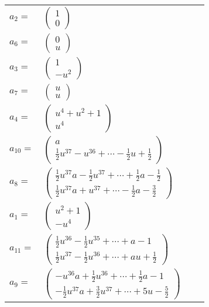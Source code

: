 \documentclass[1p]{elsarticle_modified}
\theoremstyle{definition}
\begin{document}
\begin{tabular}{m{7pt} m{180pt} m{7pt} m{180pt} }
\flushright $a_{2}=$&$\begin{pmatrix}1\\0\end{pmatrix}$ \\
\flushright $a_{6}=$&$\begin{pmatrix}0\\u\end{pmatrix}$ \\
\flushright $a_{3}=$&$\begin{pmatrix}1\\- u^2\end{pmatrix}$ \\
\flushright $a_{7}=$&$\begin{pmatrix}u\\u\end{pmatrix}$ \\
\flushright $a_{4}=$&$\begin{pmatrix}u^4+u^2+1\\u^4\end{pmatrix}$ \\
\flushright $a_{10}=$&$\begin{pmatrix}a\\\frac{1}{2} u^{37}- u^{36}+\cdots-\frac{1}{2} u+\frac{1}{2}\end{pmatrix}$ \\
\flushright $a_{8}=$&$\begin{pmatrix}\frac{1}{2} u^{37} a-\frac{1}{2} u^{37}+\cdots+\frac{1}{2} a-\frac{1}{2}\\\frac{1}{2} u^{37} a+u^{37}+\cdots-\frac{1}{2} a-\frac{3}{2}\end{pmatrix}$ \\
\flushright $a_{1}=$&$\begin{pmatrix}u^2+1\\- u^4\end{pmatrix}$ \\
\flushright $a_{11}=$&$\begin{pmatrix}\frac{1}{2} u^{36}-\frac{1}{2} u^{35}+\cdots+a-1\\\frac{1}{2} u^{37}-\frac{1}{2} u^{36}+\cdots+a u+\frac{1}{2}\end{pmatrix}$ \\
\flushright $a_{9}=$&$\begin{pmatrix}- u^{36} a+\frac{1}{2} u^{36}+\cdots+\frac{1}{2} a-1\\-\frac{1}{2} u^{37} a+\frac{3}{2} u^{37}+\cdots+5 u-\frac{5}{2}\end{pmatrix}$ \\

\end{tabular}
\end{document}
